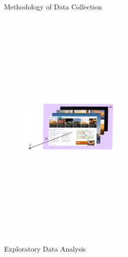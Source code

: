 \documentclass[final]{beamer}
\newlength{\colwidth}
\begin{document}
\begin{frame}[t]
\begin{columns}[t]
\begin{column}{\colwidth}
\begin{alertblock}{\LARGE{Methodology of Data Collection}}
\begin{figure}
        \includegraphics[width=0.475\textwidth, height=11.5cm]{foreground_desktopMapper.PNG}
    \end{figure}
  \end{alertblock}

\begin{block}{\LARGE{Exploratory Data Analysis}}


\end{block}
\end{column}
\end{columns}
\end{frame}
\end{document}
